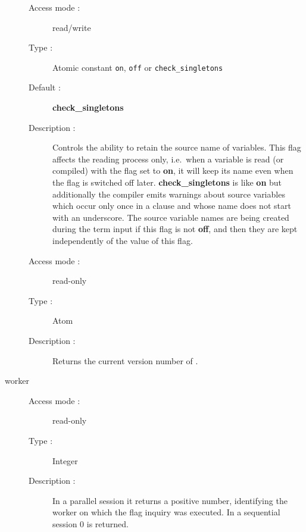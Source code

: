 \begin{description}
\begin{description}
\item[Access mode : ] read/write
\item[Type : ] Atomic constant {\tt on}, {\tt off} or {\tt check_singletons}
\item[Default : ] {\bf check_singletons}
\item[Description : ] Controls the ability to retain the source name of
variables. This flag affects the reading process only, i.e.\ when a variable
is read (or compiled) with the flag set to {\bf on}, it will keep its name
even when the flag is switched off later.
{\bf check_singletons} is like {\bf on} but additionally the compiler emits
warnings about source variables which occur only once in a clause
and whose name does not start with an underscore.
The source variable names are being created
during the term input if this flag is not {\bf off},
and then they are kept independently of the value of this flag.
\end{description}

\begin{description}
\item[Access mode : ] read-only
\item[Type : ] Atom
\item[Description : ] Returns the current version number of {\eclipse}.
\end{description}

\item[worker]
\begin{description}
\item[Access mode : ] read-only
\item[Type : ] Integer
\item[Description : ] In a parallel session it returns a positive number,
identifying the worker on which the flag inquiry was executed.
In a sequential session 0 is returned.
\end{description}

\end{description}
